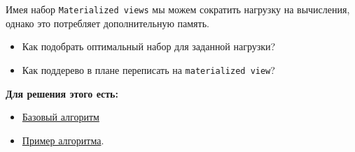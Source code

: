 \documentclass[11pt]{article}
\begin{document}
    Имея набор \texttt{Materialized views} мы можем сократить нагрузку на вычисления, однако это потребляет дополнительную память.
    \begin{itemize}
        \item Как подобрать оптимальный набор для заданной нагрузки?
        \item Как поддерево в плане переписать на \texttt{materialized view}?
    \end{itemize}

    \textbf{Для решения этого есть: }
    \begin{itemize}
        \item \href{https://dl.acm.org/doi/10.1145/235968.233333}{Базовый алгоритм}
        \item \href{https://www.researchgate.net/publication/220895475_Efficient_Utilization_of_Materialized_Views_in_a_Data_Warehouse}{Пример алгоритма}.
    \end{itemize}
\end{document}
